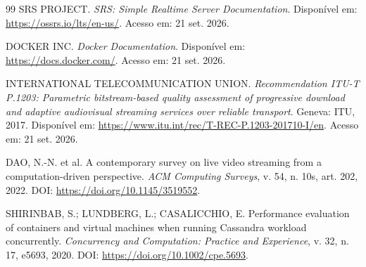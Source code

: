 \begin{thebibliography}{99}
SRS PROJECT. \textit{SRS: Simple Realtime Server Documentation}. Disponível em: \url{https://ossrs.io/lts/en-us/}. Acesso em: 21 set. 2026.

DOCKER INC. \textit{Docker Documentation}. Disponível em: \url{https://docs.docker.com/}. Acesso em: 21 set. 2026.

INTERNATIONAL TELECOMMUNICATION UNION. \textit{Recommendation ITU-T P.1203: Parametric bitstream-based quality assessment of progressive download and adaptive audiovisual streaming services over reliable transport}. Geneva: ITU, 2017. Disponível em: \url{https://www.itu.int/rec/T-REC-P.1203-201710-I/en}. Acesso em: 21 set. 2026.

DAO, N.-N. et al. A contemporary survey on live video streaming from a computation-driven perspective. \textit{ACM Computing Surveys}, v. 54, n. 10s, art. 202, 2022. DOI: \url{https://doi.org/10.1145/3519552}.

SHIRINBAB, S.; LUNDBERG, L.; CASALICCHIO, E. Performance evaluation of containers and virtual machines when running Cassandra workload concurrently. \textit{Concurrency and Computation: Practice and Experience}, v. 32, n. 17, e5693, 2020. DOI: \url{https://doi.org/10.1002/cpe.5693}.

\end{thebibliography}

